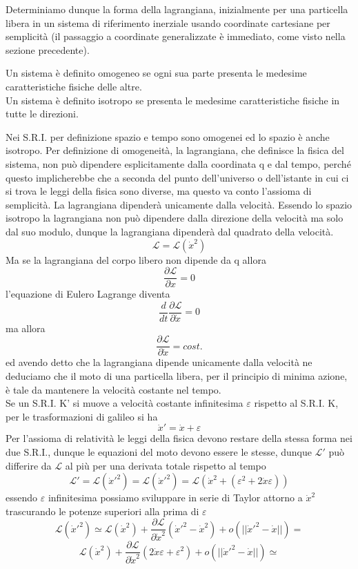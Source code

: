 \documentclass[
10pt, %
a4paper, %
oneside, %
headinclude,footinclude, %
BCOR5mm, %
]{scrartcl}
\begin{document}
Determiniamo dunque la forma della lagrangiana, inizialmente per una particella libera in un sistema di riferimento inerziale usando coordinate cartesiane per semplicità (il passaggio a coordinate generalizzate è immediato, come visto nella sezione precedente).
\begin{definizione}
	Un sistema è definito omogeneo se ogni sua parte presenta le medesime caratteristiche fisiche delle altre.\\
	Un sistema è definito isotropo se presenta le medesime caratteristiche fisiche in tutte le direzioni.
\end{definizione}
 Nei S.R.I. per definizione spazio e tempo sono omogenei ed lo spazio è anche isotropo. Per definizione di omogeneità, la lagrangiana, che definisce la fisica del sistema, non può dipendere esplicitamente dalla coordinata q e dal tempo, perché questo implicherebbe che a seconda del punto dell'universo o dell'istante in cui ci si trova le leggi della fisica sono diverse, ma questo va conto l'assioma di semplicità. La lagrangiana dipenderà unicamente dalla velocità. Essendo lo spazio isotropo la lagrangiana non può dipendere dalla direzione della velocità ma solo dal suo modulo, dunque la lagrangiana dipenderà dal quadrato della velocità.
\[\mathcal{L} = \mathcal{L}(\dot{x}^2)\]
Ma se la lagrangiana del corpo libero non dipende da q allora
\[\frac{\partial \mathcal{L}}{\partial x} = 0\]
l'equazione di Eulero Lagrange diventa
\[\frac{d}{dt}\frac{\partial\mathcal{L}}{\partial \dot{x}} = 0\]
ma allora 
\[\frac{\partial\mathcal{L}}{\partial \dot{x}} = cost.\]
ed avendo detto che la lagrangiana dipende unicamente dalla velocità ne deduciamo che il moto di una particella libera, per il principio di minima azione, è tale da mantenere la velocità costante nel tempo.\\
Se un S.R.I. K' si muove a velocità costante infinitesima $\varepsilon$ rispetto al S.R.I. K, per le trasformazioni di galileo si ha
\[\dot{x}' = \dot{x}+\varepsilon\]
Per l'assioma di relatività le leggi della fisica devono restare della stessa forma nei due S.R.I., dunque le equazioni del moto devono essere le stesse, dunque \(\mathcal{L}'\) può differire da $\mathcal{L}$ al più per una derivata totale rispetto al tempo
\[\mathcal{L}' = \mathcal{L}(\dot{x}'^2) = \mathcal{L}(\dot{x}'^2) = \mathcal{L}(\dot{x}^2+(\varepsilon^2+2\dot{x}\varepsilon))\]
essendo \(\varepsilon\) infinitesima possiamo sviluppare in serie di Taylor attorno a \(\dot{x}^2\) trascurando le potenze superiori alla prima di $\varepsilon$
\[\mathcal{L}(\dot{x}'^2) \simeq \mathcal{L}(\dot{x}^2) + \frac{\partial\mathcal{L}}{\partial\dot{x}^2}(\dot{x}'^2-\dot{x}^2)+o(||\dot{x}'^2-\dot{x}||) =\]\[ \mathcal{L}(\dot{x}^2) + \frac{\partial\mathcal{L}}{\partial\dot{x}^2}(2\dot{x}\varepsilon+\varepsilon^2)+o(||\dot{x}'^2-\dot{x}||) \simeq\]
\end{document}
